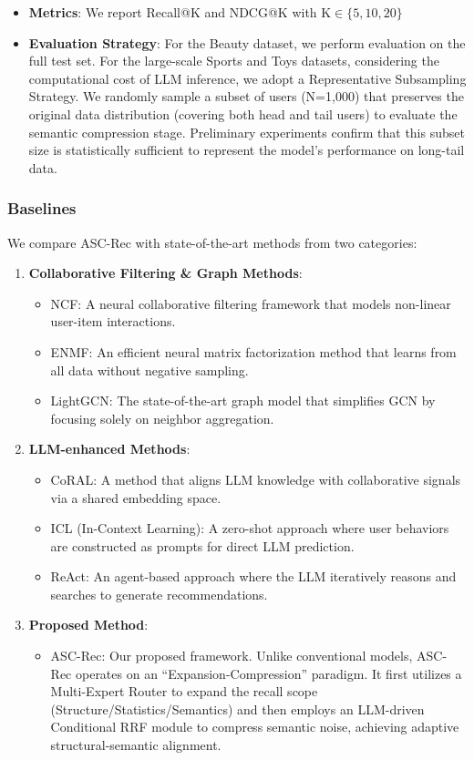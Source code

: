 \begin{itemize}
    \item \textbf{Metrics}: We report Recall@K and NDCG@K with K$\in\{5,10,20\}$
    \item \textbf{Evaluation Strategy}: For the Beauty dataset, we perform evaluation on the full test set. For the large-scale Sports and Toys datasets, considering the computational cost of LLM inference, we adopt a Representative Subsampling Strategy. We randomly sample a subset of users (N=1,000) that preserves the original data distribution (covering both head and tail users) to evaluate the semantic compression stage. Preliminary experiments confirm that this subset size is statistically sufficient to represent the model's performance on long-tail data.
\end{itemize}

\subsubsection{Baselines}
We compare ASC-Rec with state-of-the-art methods from two categories:

\begin{enumerate}
    \item \textbf{Collaborative Filtering \& Graph Methods}:
    \begin{itemize}
        \item NCF: A neural collaborative filtering framework that models non-linear user-item interactions.
        \item ENMF: An efficient neural matrix factorization method that learns from all data without negative sampling.
        \item LightGCN: The state-of-the-art graph model that simplifies GCN by focusing solely on neighbor aggregation.
    \end{itemize}
    
    \item \textbf{LLM-enhanced Methods}:
    \begin{itemize}
        \item CoRAL: A method that aligns LLM knowledge with collaborative signals via a shared embedding space.
        \item ICL (In-Context Learning): A zero-shot approach where user behaviors are constructed as prompts for direct LLM prediction.
        \item ReAct: An agent-based approach where the LLM iteratively reasons and searches to generate recommendations.
    \end{itemize}
    
    \item \textbf{Proposed Method}:
    \begin{itemize}
        \item ASC-Rec: Our proposed framework. Unlike conventional models, ASC-Rec operates on an ``Expansion-Compression'' paradigm. It first utilizes a Multi-Expert Router to expand the recall scope (Structure/Statistics/Semantics) and then employs an LLM-driven Conditional RRF module to compress semantic noise, achieving adaptive structural-semantic alignment.
    \end{itemize}
\end{enumerate}

